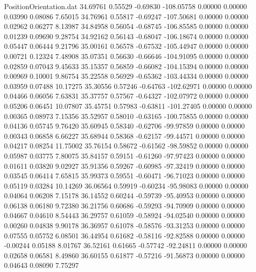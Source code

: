\begin{filecontents}{PositionOrientation.dat}
  34.69761    0.55529   -0.69830  -108.05758    0.00000    0.00000    0.03990    0.08086    7.65015
  34.76961    0.55817   -0.69247  -107.50681    0.00000    0.00000    0.02962    0.06277    8.13987
  34.84958    0.56054   -0.68745  -106.85585    0.00000    0.00000    0.01239    0.09690    9.28754
  34.92162    0.56143   -0.68047  -106.18674    0.00000    0.00000    0.05447    0.06444    9.21796
  35.00161    0.56578   -0.67532  -105.44947    0.00000    0.00000    0.00721    0.12324    7.48908
  35.07351    0.56630   -0.66646  -104.91095    0.00000    0.00000    0.02859    0.07043    9.45633
  35.15357    0.56859   -0.66082  -104.15394    0.00000    0.00000    0.00969    0.10001    9.86754
  35.22558    0.56929   -0.65362  -103.44334    0.00000    0.00000    0.03959    0.07488   10.17275
  35.30556    0.57246   -0.64763  -102.62971    0.00000    0.00000    0.04466    0.06056    7.63831
  35.37757    0.57567   -0.64327  -102.07972    0.00000    0.00000    0.05206    0.06451   10.07807
  35.45751    0.57983   -0.63811  -101.27405    0.00000    0.00000    0.00365    0.08973    7.15356
  35.52957    0.58010   -0.63165  -100.75855    0.00000    0.00000    0.04136    0.05745    9.76420
  35.60945    0.58340   -0.62706   -99.97859    0.00000    0.00000    0.00343    0.06858    6.66227
  35.68944    0.58368   -0.62157   -99.44571    0.00000    0.00000    0.04217    0.08254   11.75002
  35.76154    0.58672   -0.61562   -98.59852    0.00000    0.00000    0.05987    0.03775    7.80075
  35.84157    0.59151   -0.61260   -97.97423    0.00000    0.00000    0.01611    0.03820    9.02927
  35.91356    0.59267   -0.60985   -97.32419    0.00000    0.00000    0.03545    0.06414    7.65815
  35.99373    0.59551   -0.60471   -96.71023    0.00000    0.00000    0.05119    0.03284   10.14269
  36.06564    0.59919   -0.60234   -95.98083    0.00000    0.00000    0.04064    0.06208    7.15178
  36.14552    0.60244   -0.59739   -95.40953    0.00000    0.00000    0.06138    0.06180    9.72380
  36.21756    0.60686   -0.59293   -94.70909    0.00000    0.00000    0.04667    0.04610    8.54443
  36.29757    0.61059   -0.58924   -94.02540    0.00000    0.00000    0.00260    0.04838    9.90178
  36.36957    0.61078   -0.58576   -93.31253    0.00000    0.00000    0.07555    0.05752    6.08501
  36.44954    0.61682   -0.58116   -92.82588    0.00000    0.00000   -0.00244    0.05188    8.01767
  36.52161    0.61665   -0.57742   -92.24811    0.00000    0.00000    0.02658    0.06581    8.49860
  36.60155    0.61877   -0.57216   -91.56873    0.00000    0.00000    0.04643    0.08090    7.75297

\end{filecontents}
